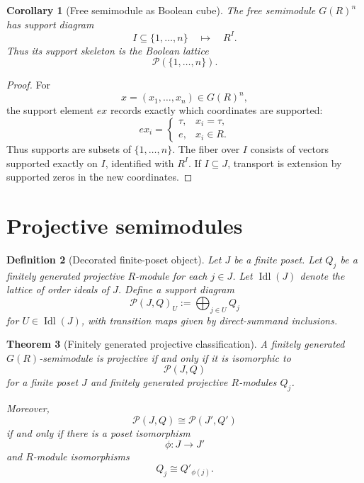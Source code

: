 \documentclass[11pt]{article}
\newtheorem{theorem}{Theorem}[section]
\newtheorem{corollary}[theorem]{Corollary}
\newtheorem{definition}[theorem]{Definition}
\begin{document}
\begin{corollary}[Free semimodule as Boolean cube]
The free semimodule \(G(R)^n\) has support diagram
\[
I\subseteq\{1,\dots,n\}
\quad\longmapsto\quad
R^I.
\]
Thus its support skeleton is the Boolean lattice
\[
\mathcal P(\{1,\dots,n\}).
\]
\end{corollary}

\begin{proof}
For
\[
x=(x_1,\dots,x_n)\in G(R)^n,
\]
the support element \(ex\) records exactly which coordinates are supported:
\[
ex_i=
\begin{cases}
\tau,&x_i=\tau,\\
e,&x_i\in R.
\end{cases}
\]
Thus supports are subsets of \(\{1,\dots,n\}\). The fiber over \(I\) consists of vectors supported exactly on \(I\), identified with \(R^I\). If \(I\subseteq J\), transport is extension by supported zeros in the new coordinates.
\end{proof}

\section{Projective semimodules}

\begin{definition}[Decorated finite-poset object]
Let \(J\) be a finite poset. Let \(Q_j\) be a finitely generated projective \(R\)-module for each \(j\in J\). Let \(\operatorname{Idl}(J)\) denote the lattice of order ideals of \(J\). Define a support diagram
\[
\mathcal P(J,Q)_U:=\bigoplus_{j\in U}Q_j
\]
for \(U\in\operatorname{Idl}(J)\), with transition maps given by direct-summand inclusions.
\end{definition}

\begin{theorem}[Finitely generated projective classification]
A finitely generated \(G(R)\)-semimodule is projective if and only if it is isomorphic to
\[
\mathcal P(J,Q)
\]
for a finite poset \(J\) and finitely generated projective \(R\)-modules \(Q_j\).

Moreover,
\[
\mathcal P(J,Q)\cong\mathcal P(J',Q')
\]
if and only if there is a poset isomorphism
\[
\phi:J\to J'
\]
and \(R\)-module isomorphisms
\[
Q_j\cong Q'_{\phi(j)}.
\]
\end{theorem}
\end{document}
